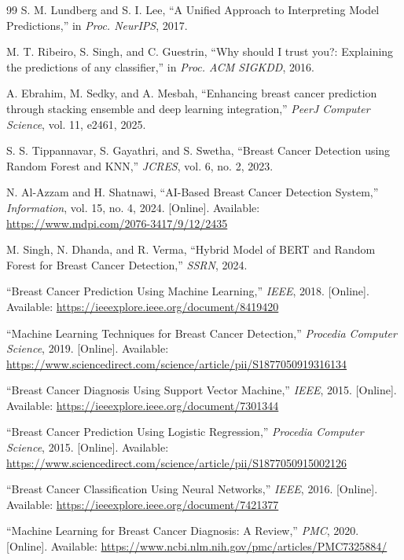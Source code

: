 \documentclass[12pt]{article}
\begin{document}
\begin{thebibliography}{99}
S. M. Lundberg and S. I. Lee, ``A Unified Approach to Interpreting Model Predictions,'' in \textit{Proc. NeurIPS}, 2017.

M. T. Ribeiro, S. Singh, and C. Guestrin, ``Why should I trust you?: Explaining the predictions of any classifier,'' in \textit{Proc. ACM SIGKDD}, 2016.

A. Ebrahim, M. Sedky, and A. Mesbah, ``Enhancing breast cancer prediction through stacking ensemble and deep learning integration,'' \textit{PeerJ Computer Science}, vol. 11, e2461, 2025.

S. S. Tippannavar, S. Gayathri, and S. Swetha, ``Breast Cancer Detection using Random Forest and KNN,'' \textit{JCRES}, vol. 6, no. 2, 2023.

N. Al-Azzam and H. Shatnawi, ``AI-Based Breast Cancer Detection System,'' \textit{Information}, vol. 15, no. 4, 2024. [Online]. Available: \url{https://www.mdpi.com/2076-3417/9/12/2435}

M. Singh, N. Dhanda, and R. Verma, ``Hybrid Model of BERT and Random Forest for Breast Cancer Detection,'' \textit{SSRN}, 2024.

``Breast Cancer Prediction Using Machine Learning,'' \textit{IEEE}, 2018. [Online]. Available: \url{https://ieeexplore.ieee.org/document/8419420}

``Machine Learning Techniques for Breast Cancer Detection,'' \textit{Procedia Computer Science}, 2019. [Online]. Available: \url{https://www.sciencedirect.com/science/article/pii/S1877050919316134}

``Breast Cancer Diagnosis Using Support Vector Machine,'' \textit{IEEE}, 2015. [Online]. Available: \url{https://ieeexplore.ieee.org/document/7301344}

``Breast Cancer Prediction Using Logistic Regression,'' \textit{Procedia Computer Science}, 2015. [Online]. Available: \url{https://www.sciencedirect.com/science/article/pii/S1877050915002126}

``Breast Cancer Classification Using Neural Networks,'' \textit{IEEE}, 2016. [Online]. Available: \url{https://ieeexplore.ieee.org/document/7421377}

``Machine Learning for Breast Cancer Diagnosis: A Review,'' \textit{PMC}, 2020. [Online]. Available: \url{https://www.ncbi.nlm.nih.gov/pmc/articles/PMC7325884/}


\end{thebibliography}
\end{document}
